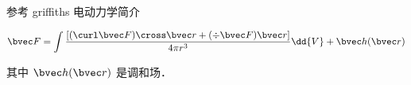 
参考 griffiths 电动力学简介

\begin{equation}
\bvec F = \int \frac{[(\curl \bvec F)\cross \bvec r + (\div \bvec F)\bvec r]}{4\pi r^3} \dd{V} + \bvec h(\bvec r)
\end{equation}

其中 $\bvec h(\bvec r)$ 是调和场．
